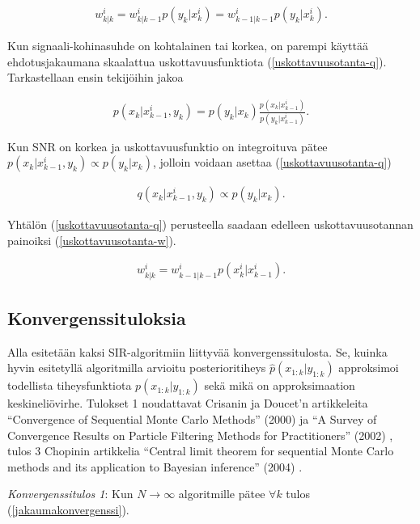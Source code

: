 \documentclass[
  12pt,
  a4paper, twoside]{book}
\begin{document}
\begin{align}\label{prioriotanta-w}
w^i_{k|k} = w^i_{k|k-1}p(y_k|x^i_k) = w^i_{k-1|k-1}p(y_k|x^i_k).
\end{align}

Kun signaali-kohinasuhde on kohtalainen tai korkea, on parempi käyttää ehdotusjakaumana skaalattua uskottavuusfunktiota (\ref{uskottavuusotanta-q}). Tarkastellaan ensin tekijöihin jakoa

\begin{align}\label{uskottavuusotanta-factorization}
p(x_k|x^i_{k-1},y_k)=p(y_k|x_k)\frac{p(x_k|x^i_{k-1})}{p(y_k|x^i_{k-1})}.
\end{align}

\noindent Kun SNR on korkea ja uskottavuusfunktio on integroituva pätee \(p(x_k|x^i_{k-1},y_{k}) \propto p(y_k|x_k)\), jolloin voidaan asettaa (\ref{uskottavuusotanta-q})

\begin{align}\label{uskottavuusotanta-q}
q(x_k|x^i_{k-1},y_{k}) \propto p(y_k|x_k).
\end{align}

\noindent Yhtälön (\ref{uskottavuusotanta-q}) perusteella saadaan edelleen uskottavuusotannan painoiksi (\ref{uskottavuusotanta-w}).

\begin{align}\label{uskottavuusotanta-w}
w^i_{k|k} = w^i_{k-1|k-1}p(x^i_k|x^i_{k-1}).
\end{align}

\subsection{Konvergenssituloksia}

Alla esitetään kaksi SIR-algoritmiin liittyvää konvergenssitulosta. Se, kuinka hyvin esitetyllä algoritmilla arvioitu posterioritiheys \(\hat{p}(x_{1:k}|y_{1:k})\) approksimoi todellista tiheysfunktiota \(p(x_{1:k}|y_{1:k})\) sekä mikä on approksimaation keskineliövirhe. Tulokset 1 noudattavat Crisanin ja Doucet'n artikkeleita ``Convergence of Sequential Monte Carlo Methods'' (2000) \citep{crisan-2000} ja ``A Survey of Convergence Results on Particle Filtering Methods for Practitioners'' (2002) \citep{crisan-2002}, tulos 3 Chopinin artikkelia ``Central limit theorem for sequential Monte Carlo methods and its application to Bayesian inference'' (2004) \citep{chopin-2004}.

\textit{Konvergenssitulos 1}: Kun \(N \to \infty\) algoritmille pätee \(\forall k\) tulos (\ref{jakaumakonvergenssi}).
\end{document}
